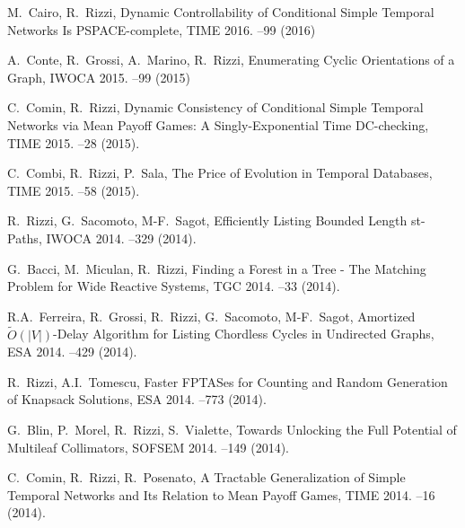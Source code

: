 \begin{etaremune}
  \item {\sc M.~Cairo, R.~Rizzi},
   \newblock Dynamic Controllability of Conditional Simple Temporal Networks Is PSPACE-complete,
   \newblock TIME 2016.
   --99 (2016)

  \item {\sc A.~Conte, R.~Grossi, A.~Marino, R.~Rizzi},
   \newblock Enumerating Cyclic Orientations of a Graph,
   \newblock IWOCA 2015.
   --99 (2015)

  \item {\sc C.~Comin, R.~Rizzi},
   \newblock Dynamic Consistency of Conditional Simple Temporal Networks via Mean Payoff Games: A Singly-Exponential Time DC-checking,
   \newblock TIME 2015.
   --28 (2015).

  \item {\sc C.~Combi, R.~Rizzi, P.~Sala},
   \newblock The Price of Evolution in Temporal Databases,
   \newblock TIME 2015.
   --58 (2015).

  \item {\sc R.~Rizzi, G.~Sacomoto, M-F.~Sagot},
   \newblock Efficiently Listing Bounded Length st-Paths,
   \newblock IWOCA 2014.
   --329 (2014).

  \item {G.~Bacci, M.~Miculan, R.~Rizzi},
   \newblock Finding a Forest in a Tree - The Matching Problem for Wide Reactive Systems,
   \newblock TGC 2014.
   --33 (2014).

  \item {R.A.~Ferreira, R.~Grossi, R.~Rizzi, G.~Sacomoto, M-F.~Sagot},
   \newblock Amortized $\tilde{O}(|V|)$-Delay Algorithm for Listing Chordless Cycles in Undirected Graphs,
   \newblock ESA 2014.
   --429 (2014).

  \item {R.~Rizzi, A.I.~Tomescu},
   \newblock Faster FPTASes for Counting and Random Generation of Knapsack Solutions,
   \newblock ESA 2014.
   --773 (2014).

  \item {G.~Blin, P.~Morel, R.~Rizzi, S.~Vialette},
   \newblock Towards Unlocking the Full Potential of Multileaf Collimators,
   \newblock SOFSEM 2014.
   --149 (2014).

  \item {C.~Comin, R.~Rizzi, R.~Posenato},
   \newblock A Tractable Generalization of Simple Temporal Networks and Its Relation to Mean Payoff Games,
   \newblock TIME 2014.
   --16 (2014).


\end{etaremune}
